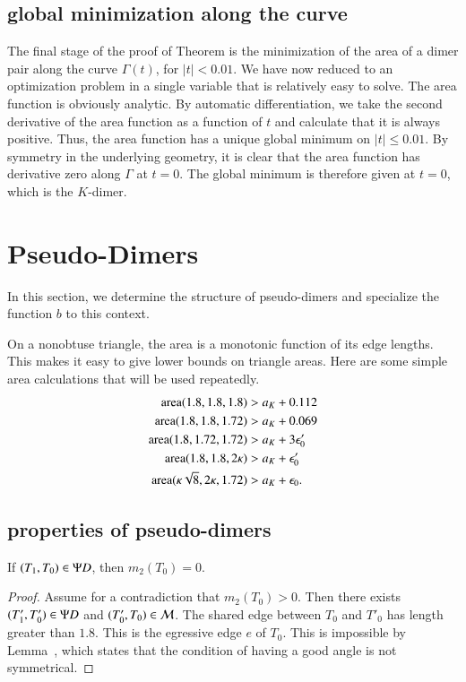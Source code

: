 \subsection{global minimization along the curve}

The final stage of the proof of Theorem  is the minimization of the area of a dimer pair along the
curve $\Gamma(t)$, for $|t|<0.01$.    We have now reduced to an optimization problem in a single variable 
that is relatively easy to solve.  The area function is obviously analytic.
By automatic differentiation, we take the second derivative of the area
function as a function of $t$ and calculate that it is always positive.  Thus, the area function has a unique
global minimum on $|t|\le 0.01$.  
By symmetry in the underlying geometry, 
it is clear that the area function has derivative zero along $\Gamma$ at
$t=0$.  The global minimum is therefore given at $t=0$, which is the $K$-dimer.

\section{Pseudo-Dimers}

In this section, we determine the structure of pseudo-dimers and specialize
the function $b$ to this context.

On a nonobtuse triangle, the area is a monotonic function of its edge lengths.
This makes it easy to give lower bounds on triangle areas.
Here are some simple    area calculations that will be used repeatedly.
\begin{align*}
{\operatorname{area}}(1.8,1.8,1.8) &> a_K + 0.112\\
{\operatorname{area}}(1.8,1.8,1.72) &> a_K + 0.069\\
{\operatorname{area}}(1.8,1.72,1.72) &> a_K + 3\epsilon_0'\\
{\operatorname{area}}(1.8,1.8,2\kappa) &> a_K + \epsilon_0'\\
{\operatorname{area}}(\kappa\sqrt8,2\kappa,1.72) &> a_K +\epsilon_0.
\end{align*}


\subsection{properties of pseudo-dimers}

\begin{lemma}  If $(T_1,T_0)\in\Psi D$, then $m_2(T_0)=0$.
\end{lemma}

\begin{proof} Assume for a contradiction that $m_2(T_0)>0$.  Then there exists $(T'_1,T_0')\in\Psi D$ and
$(T'_0,T_0)\in\mathcal M$.  The shared edge between $T_0$ and $T'_0$ has length greater than $1.8$.
This is the egressive edge $e$ of $T_0$.  This is impossible by Lemma~, which states
that the condition of having a good angle is not symmetrical.
\end{proof}

